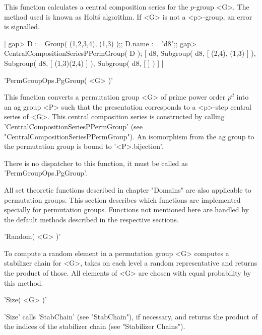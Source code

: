 This  function calculates a central  composition series for the $p$-group
<G>.   The  method used is known as Holt\'s algorithm.  If <G>  is not  a
<p>-group, an error is signalled.

|    gap> D := Group( (1,2,3,4), (1,3) );; D.name := "d8";;
    gap> CentralCompositionSeriesPPermGroup( D );
    [ d8, Subgroup( d8, [ (2,4), (1,3) ] ),
      Subgroup( d8, [ (1,3)(2,4) ] ), Subgroup( d8, [  ] ) ] |


'PermGroupOps.PgGroup( <G> )'

This function converts a permutation group <G> of prime power order $p^d$
into an ag group <P> such that the presentation corresponds to a <p>-step
central series of <G>.  This central composition series is constructed by
calling             'CentralCompositionSeriesPPermGroup'             (see
"CentralCompositionSeriesPPermGroup").   An isomorphism from the ag group
to the permutation group is bound to '<P>.bijection'.

There   is  no  dispatcher  to  this  function,  it  must  be  called  as
'PermGroupOps.PgGroup'.


All  set theoretic  functions  described in  chapter  "Domains"  are also
applicable to permutation groups.  This section describes which functions
are  implemented  specially  for  permutation  groups.    Functions   not
mentioned  here  are  handled  by the default methods  described  in  the
respective sections.

\vspace{5mm}
'Random( <G> )'%

To compute a random element in a permutation group <G>  {\GAP} computes a
stabilizer chain for <G>, takes on each level a random representative and
returns the  product of those.  All elements of <G> are chosen with equal
probability by this method.

\vspace{5mm}
'Size( <G> )'%

'Size' calls  'StabChain'  (see "StabChain"),  if necessary,  and
returns  the  product  of  the  indices  of  the  stabilizer  chain  (see
"Stabilizer Chains").


